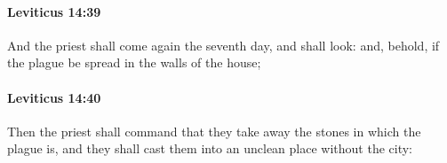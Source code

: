 		\paragraph{Leviticus 14:39} %
			\label{LEVITICUS-14-39}

			And the priest shall come again the seventh day, and shall look: and, behold, if the plague be spread in the walls of the house;


		\paragraph{Leviticus 14:40} %
			\label{LEVITICUS-14-40}

			Then the priest shall command that they take away the stones in which the plague is, and they shall cast them into an unclean place without the city:


